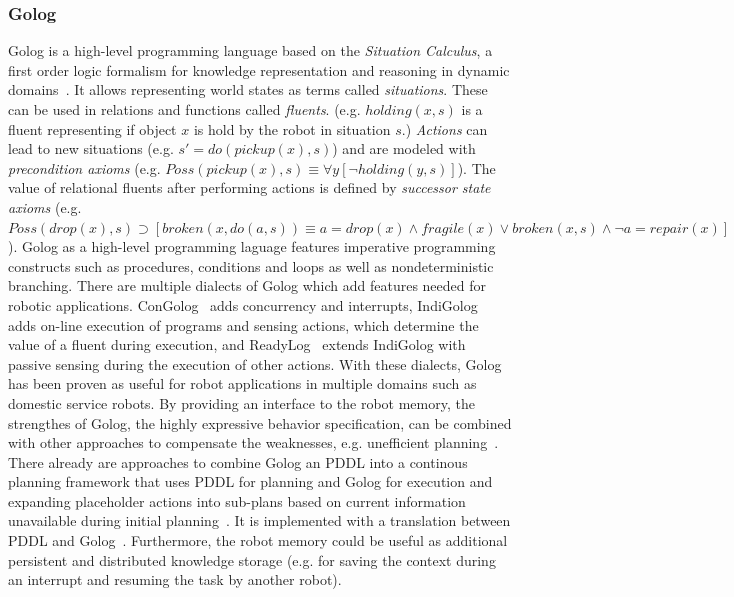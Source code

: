 \documentclass[a4paper,11pt]{article}
\begin{document}
\subsubsection{Golog } Golog is a high-level programming language based on the
\emph{Situation Calculus}, a first order logic formalism for knowledge
representation and reasoning in dynamic domains~\cite{Golog}. It
allows representing world states as terms called
\emph{situations}. These can be used in relations and functions called
\emph{fluents}. (e.g. $holding(x,s)$ is a fluent representing if
object $x$ is hold by the robot in situation $s$.) \emph{Actions} can
lead to new situations (e.g. $s'=do(pickup(x),s)$) and are modeled
with \emph{precondition axioms} (e.g. $Poss(pickup(x),s) \equiv
\forall y [\neg holding(y,s)]$). The value of relational fluents after
performing actions is defined by \emph{successor state axioms}
(e.g. $Poss(drop(x),s) \supset [broken(x,do(a,s)) \equiv a=drop(x)
  \wedge fragile(x) \vee broken(x,s) \wedge \neg a=repair(x)]$).
Golog as a high-level programming laguage features imperative
programming constructs such as procedures, conditions and loops as
well as nondeterministic branching. There are multiple dialects of
Golog which add features needed for robotic
applications. ConGolog~\cite{ConGolog} adds concurrency and
interrupts, IndiGolog~\cite{IndiGolog} adds on-line execution of
programs and sensing actions, which determine the value of a fluent
during execution, and ReadyLog~\cite{ferrein08ras} extends IndiGolog
with passive sensing during the execution of other actions. With these
dialects, Golog has been proven as useful for robot applications in
multiple domains such as domestic service robots. By providing an
interface to the robot memory, the strengthes of Golog, the highly
expressive behavior specification, can be combined with other
approaches to compensate the weaknesses, e.g. unefficient
planning~\cite{Golog-Planning}. There already are approaches to
combine Golog an PDDL into a continous planning framework that uses
PDDL for planning and Golog for execution and expanding placeholder
actions into sub-plans based on current information unavailable during
initial planning~\cite{ContPlanGolog}. It is implemented with a
translation between PDDL and
Golog~\cite{Golog-PDDL-Trans}. Furthermore, the robot memory could be
useful as additional persistent and distributed knowledge storage
(e.g. for saving the context during an interrupt and resuming the task by another robot).
\end{document}
